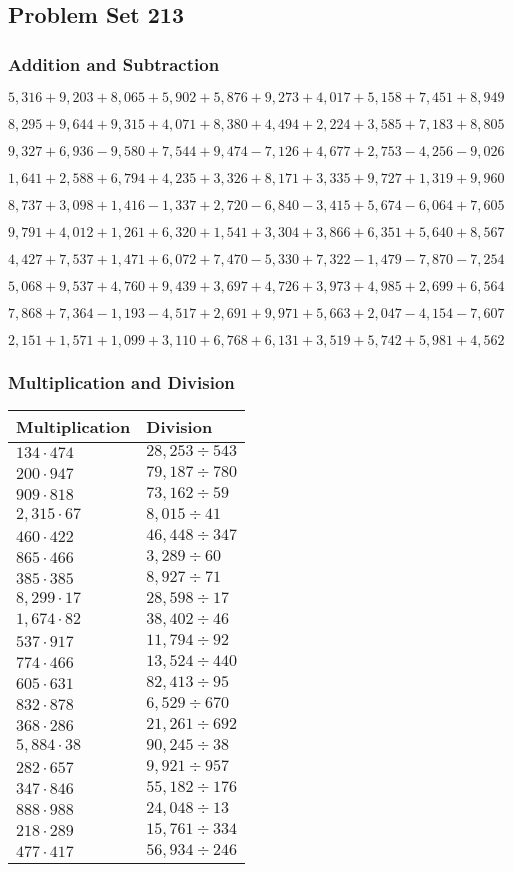 \hypertarget{problem-set-213}{%
\subsection{Problem Set 213}\label{problem-set-213}}

\hypertarget{addition-and-subtraction}{%
\subsubsection{Addition and
Subtraction}\label{addition-and-subtraction}}

\(5,316+9,203+8,065+5,902+5,876+9,273+4,017+5,158+7,451+8,949\)

\(8,295+9,644+9,315+4,071+8,380+4,494+2,224+3,585+7,183+8,805\)

\(9,327+6,936-9,580+7,544+9,474-7,126+4,677+2,753-4,256-9,026\)

\(1,641+2,588+6,794+4,235+3,326+8,171+3,335+9,727+1,319+9,960\)

\(8,737+3,098+1,416-1,337+2,720-6,840-3,415+5,674-6,064+7,605\)

\(9,791+4,012+1,261+6,320+1,541+3,304+3,866+6,351+5,640+8,567\)

\(4,427+7,537+1,471+6,072+7,470-5,330+7,322-1,479-7,870-7,254\)

\(5,068+9,537+4,760+9,439+3,697+4,726+3,973+4,985+2,699+6,564\)

\(7,868+7,364-1,193-4,517+2,691+9,971+5,663+2,047-4,154-7,607\)

\(2,151+1,571+1,099+3,110+6,768+6,131+3,519+5,742+5,981+4,562\)

\hypertarget{multiplication-and-division}{%
\subsubsection{Multiplication and
Division}\label{multiplication-and-division}}

\begin{longtable}[]{@{}ll@{}}
\toprule
Multiplication & Division\tabularnewline
\midrule
\endhead
\(134\cdot474\) & \(28,253÷543\)\tabularnewline
\(200\cdot947\) & \(79,187÷780\)\tabularnewline
\(909\cdot818\) & \(73,162÷59\)\tabularnewline
\(2,315\cdot67\) & \(8,015÷41\)\tabularnewline
\(460\cdot422\) & \(46,448÷347\)\tabularnewline
\(865\cdot466\) & \(3,289÷60\)\tabularnewline
\(385\cdot385\) & \(8,927÷71\)\tabularnewline
\(8,299\cdot17\) & \(28,598÷17\)\tabularnewline
\(1,674\cdot82\) & \(38,402÷46\)\tabularnewline
\(537\cdot917\) & \(11,794÷92\)\tabularnewline
\(774\cdot466\) & \(13,524÷440\)\tabularnewline
\(605\cdot631\) & \(82,413÷95\)\tabularnewline
\(832\cdot878\) & \(6,529÷670\)\tabularnewline
\(368\cdot286\) & \(21,261÷692\)\tabularnewline
\(5,884\cdot38\) & \(90,245÷38\)\tabularnewline
\(282\cdot657\) & \(9,921÷957\)\tabularnewline
\(347\cdot846\) & \(55,182÷176\)\tabularnewline
\(888\cdot988\) & \(24,048÷13\)\tabularnewline
\(218\cdot289\) & \(15,761÷334\)\tabularnewline
\(477\cdot417\) & \(56,934÷246\)\tabularnewline
\bottomrule
\end{longtable}
